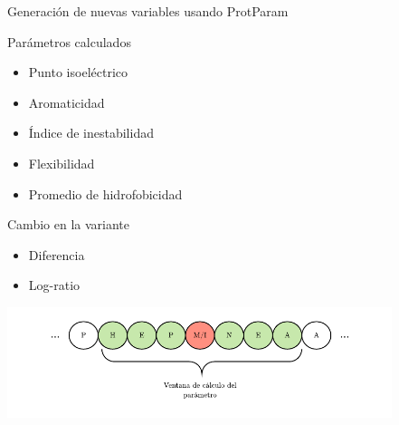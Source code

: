 \documentclass[
  spanish,
  ignorenonframetext,
]{beamer}
\providecommand{\tightlist}{%
  \setlength{\itemsep}{0pt}\setlength{\parskip}{0pt}}
\begin{document}
\begin{frame}{Generación de nuevas variables usando ProtParam}
\protect\hypertarget{generaciuxf3n-de-nuevas-variables-usando-protparam}{}

\begin{block}{Parámetros calculados}

\begin{itemize}
\tightlist
\item
  Punto isoeléctrico
\item
  Aromaticidad
\item
  Índice de inestabilidad
\item
  Flexibilidad
\item
  Promedio de hidrofobicidad
\end{itemize}

\end{block}

\begin{block}{Cambio en la variante}

\begin{itemize}
\tightlist
\item
  Diferencia
\item
  Log-ratio
\end{itemize}

\end{block}

\includegraphics[width=4.42708in,height=\textheight]{protparam.pdf}

\end{frame}
\end{document}
